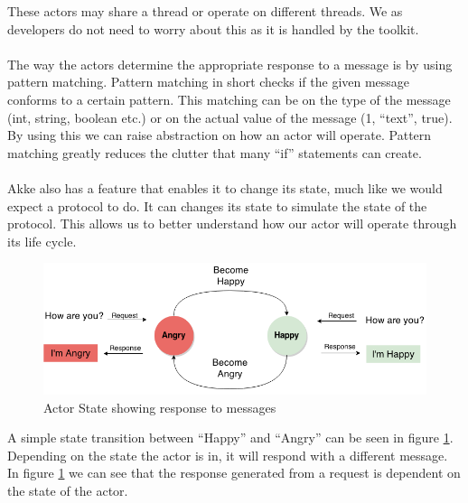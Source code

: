 These actors may share a thread or operate on different threads. We as developers do not need to worry about this as it is handled by the toolkit.
\\\\
The way the actors determine the appropriate response to a message is by using pattern matching. Pattern matching in short checks if the given message conforms to a certain pattern. This matching can be on the type of the message (int, string, boolean etc.) or on the actual value of the message (1, ``text'', true). By using this we can raise abstraction on how an actor will operate. Pattern matching greatly reduces the clutter that many ``if'' statements can create.
\\\\
Akke also has a feature that enables it to change its state, much like we would expect a protocol to do. It can changes its state to simulate the state of the protocol. This allows us to better understand how our actor will operate through its life cycle.
\begin{figure}[h]
	\centering
	\includegraphics[scale=0.45]{images/tools/ActorState.png} 
	\caption{Actor State showing response to messages}
	\label{fig:ActorState}
\end{figure}
A simple state transition between ``Happy'' and ``Angry'' can be seen in figure \ref{fig:ActorState}. Depending on the state the actor is in, it will respond with a different message. In figure \ref{fig:ActorState} we can see that the response generated from a request is dependent on the state of the actor.


